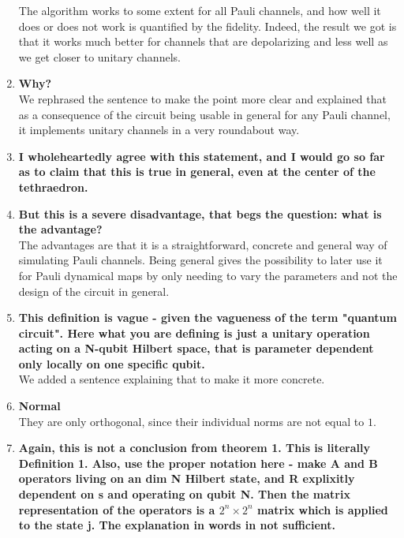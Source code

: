 \documentclass[10pt,letterpaper]{article} %
\begin{document}
\begin{enumerate}
The algorithm works to some extent for all Pauli channels, and how well
it does or does not work is quantified by the fidelity.
Indeed, the result we got is that it works much better for channels that are depolarizing
and less well as we get closer to unitary channels.


\item \textbf{Why?}\\
We rephrased the sentence to make the point more clear
and explained that as a consequence of the circuit being usable in general for any Pauli channel,
it implements unitary channels in a very roundabout way.



\item \textbf{I wholeheartedly agree with this statement, and I would go so far as to claim that this is true in general, even at the center of the tethraedron.} \\





\item \textbf{But this is a severe disadvantage, that begs the question: what is the advantage?} \\

The advantages are that it is a straightforward, concrete and general way
of simulating Pauli channels.
Being general gives the possibility to later use it for Pauli dynamical maps by only needing to vary the parameters
and not the design of the circuit in general.


\item \textbf{This definition is vague - given the vagueness of the term "quantum circuit".
 Here what you are defining is just a unitary operation acting on a N-qubit Hilbert space, that is parameter dependent only locally on one specific qubit. } \\
 
We added a sentence explaining that to make it more concrete.

 
\item \textbf{Normal}\\

They are only orthogonal, since their individual norms are not equal to $1$.
 
\item \textbf{Again, this is not a conclusion from theorem 1. This is literally Definition 1. Also, use the proper notation here - make A and B operators living on an dim N Hilbert state, and R explixitly dependent on s and operating on qubit N. Then the matrix representation of the operators is a $2^n\times 2^n$ matrix which is applied to the state j. The explanation in words in not sufficient.} \\


\end{enumerate}
\end{document}
